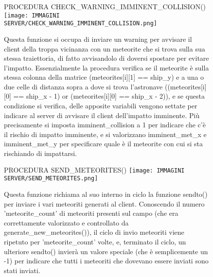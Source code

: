 \documentclass{article}
\begin{document}
\begin{enumerate}
   \begin{figure}[!htb]
    \item PROCEDURA CHECK\_WARNING\_IMMINENT\_COLLISION() \newline
       \centering
       \texttt{[image: IMMAGINI SERVER/CHECK\_WARNING\_IMMINENT\_COLLISION.png]}
       \raggedright\par
       Questa funzione si occupa di inviare un warning per avvisare il client della troppa vicinanza con un meteorite che si trova sulla sua stessa traiettoria, di fatto avvisandolo di doversi spostare per evitare l'impatto. \newline
       Essenzialmente la procedura verifica se il meteorite è sulla stessa colonna della matrice (meteorites[i][1] == ship\_y) e a una o due celle di distanza sopra a dove si trova l'astronave ((meteorites[i][0] == ship\_x - 1) or (meteorites[i][0] == ship\_x - 2)), e se questa condizione si verifica, delle apposite variabili vengono settate per indicare al server di avvisare il client dell'impatto imminente. \newline
       Più precisamente si imposta imminent\_collision a 1 per indicare che c'è il rischio di impatto imminente, e si valorizzano imminent\_met\_x e imminent\_met\_y per specificare quale è il meteorite con cui si sta rischiando di impattarsi. \newline
   \end{figure}

    \begin{figure}[!htb]
    \item PROCEDURA SEND\_METEORITES() \newline
        \centering
        \texttt{[image: IMMAGINI SERVER/SEND\_METEORITES.png]}
        \raggedright\par
        Questa funzione richiama al suo interno in ciclo la funzione sendto() per inviare i vari meteoriti generati al client. \newline
        Conoscendo il numero 'meteorite\_count' di meteoriti presenti sul campo (che era correttamente valorizzato e controllato da generate\_new\_meteorites()), il ciclo di invio meteoriti viene ripetuto per 'meteorite\_count' volte, e, terminato il ciclo, un ulteriore sendto() invierà un valore speciale (che è semplicemente un -1) per indicare che tutti i meteoriti che dovevano essere inviati sono stati inviati. \newline
    \end{figure}


\end{enumerate}
\end{document}
